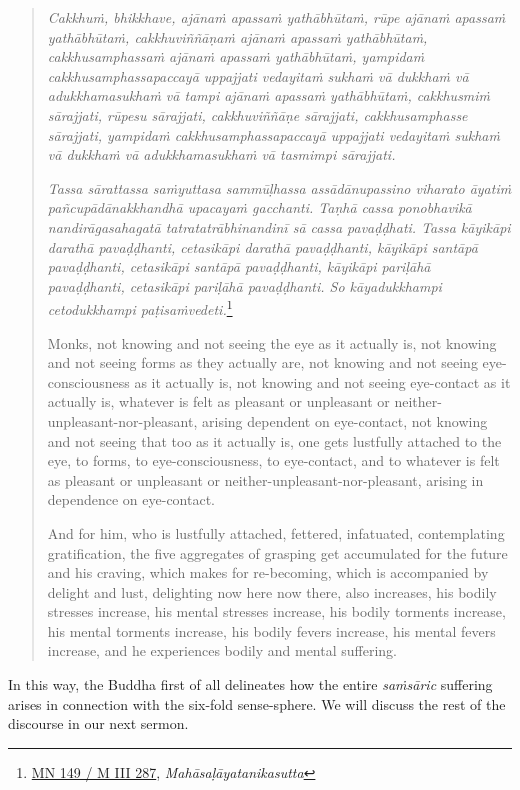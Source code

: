 \begin{quote}
\emph{Cakkhuṁ, bhikkhave, ajānaṁ apassaṁ yathābhūtaṁ, rūpe ajānaṁ apassaṁ yathābhūtaṁ, cakkhuviññāṇaṁ ajānaṁ apassaṁ yathābhūtaṁ, cakkhusamphassaṁ ajānaṁ apassaṁ yathābhūtaṁ, yampidaṁ cakkhusamphassapaccayā uppajjati vedayitaṁ sukhaṁ vā dukkhaṁ vā adukkhamasukhaṁ vā tampi ajānaṁ apassaṁ yathābhūtaṁ, cakkhusmiṁ sārajjati, rūpesu sārajjati, cakkhuviññāṇe sārajjati, cakkhusamphasse sārajjati, yampidaṁ cakkhusamphassapaccayā uppajjati vedayitaṁ sukhaṁ vā dukkhaṁ vā adukkhamasukhaṁ vā tasmimpi sārajjati.}

\emph{Tassa sārattassa saṁyuttasa sammūḷhassa assādānupassino viharato āyatiṁ pañcupādānakkhandhā upacayaṁ gacchanti. Taṇhā cassa ponobhavikā nandirāgasahagatā tatratatrābhinandinī sā cassa pavaḍḍhati. Tassa kāyikāpi darathā pavaḍḍhanti, cetasikāpi darathā pavaḍḍhanti, kāyikāpi santāpā pavaḍḍhanti, cetasikāpi santāpā pavaḍḍhanti, kāyikāpi pariḷāhā pavaḍḍhanti, cetasikāpi pariḷāhā pavaḍḍhanti. So kāyadukkhampi cetodukkhampi paṭisaṁvedeti.}\footnote{\href{https://suttacentral.net/mn149/pli/ms}{MN 149 / M III 287}, \emph{Mahāsaḷāyatanikasutta}}

Monks, not knowing and not seeing the eye as it actually is, not knowing and not seeing forms as they actually are, not knowing and not seeing eye-consciousness as it actually is, not knowing and not seeing eye-contact as it actually is, whatever is felt as pleasant or unpleasant or neither-unpleasant-nor-pleasant, arising dependent on eye-contact, not knowing and not seeing that too as it actually is, one gets lustfully attached to the eye, to forms, to eye-consciousness, to eye-contact, and to whatever is felt as pleasant or unpleasant or neither-unpleasant-nor-pleasant, arising in dependence on eye-contact.

And for him, who is lustfully attached, fettered, infatuated, contemplating gratification, the five aggregates of grasping get accumulated for the future and his craving, which makes for re-becoming, which is accompanied by delight and lust, delighting now here now there, also increases, his bodily stresses increase, his mental stresses increase, his bodily torments increase, his mental torments increase, his bodily fevers increase, his mental fevers increase, and he experiences bodily and mental suffering.
\end{quote}

In this way, the Buddha first of all delineates how the entire \emph{saṁsāric} suffering arises in connection with the six-fold sense-sphere. We will discuss the rest of the discourse in our next sermon.
